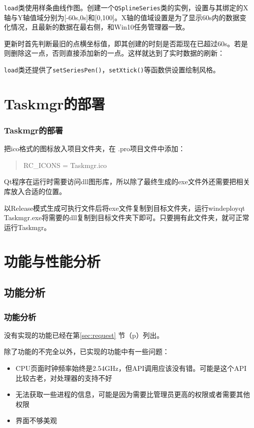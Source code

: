\documentclass{beamer}
\newcommand\code[1]{\texttt{#1}}
\begin{document}
\begin{frame}
    \code{load}类使用样条曲线作图。创建一个\code{QSplineSeries}类的实例，设置与其绑定的X轴与Y轴值域分别为[-60s,0s]和[0,100]。X轴的值域设置是为了显示60s内的数据变化情况，且最新的数据在最右侧，和Win10任务管理器一致。

更新时首先判断最旧的点横坐标值，即其创建的时刻是否距现在已超过60s。若是则删除这一点，否则直接添加新的一点。这样就达到了实时数据的刷新：
\end{frame}

\begin{frame}
    
{
    \ttfamily
    
}
\code{load}类还提供了\code{setSeriesPen()}，\code{setXtick()}等函数供设置绘制风格。
\end{frame}

\section{Taskmgr的部署}
\begin{frame}
    \frametitle{Taskmgr的部署}
    把ico格式的图标放入项目文件夹，在 .pro项目文件中添加：
\begin{quote}
    \ttfamily
    RC\_ICONS = Taskmgr.ico
\end{quote}

Qt程序在运行时需要访问dll图形库，所以除了最终生成的exe文件外还需要把相关库放入合适的位置。

以Release模式生成可执行文件后将exe文件复制到目标文件夹，运行windeployqt Taskmgr.exe将需要的dll复制到目标文件夹下即可。只要拥有此文件夹，就可正常运行Taskmgr。
\end{frame}

\section{功能与性能分析}

\subsection{功能分析}
\begin{frame}
    \frametitle{功能分析}
    没有实现的功能已经在第\ref{sec:request} 节（p\pageref{sec:request}）列出。

除了功能的不完全以外，已实现的功能中有一些问题：
\begin{itemize}
    \item CPU页面时钟频率始终是2.54GHz，但API调用应该没有错。可能是这个API比较古老，对处理器的支持不好
    \item 无法获取一些进程的信息，可能是因为需要比管理员更高的权限或者需要其他权限
    \item 界面不够美观
\end{itemize}
\end{frame}
\end{document}

